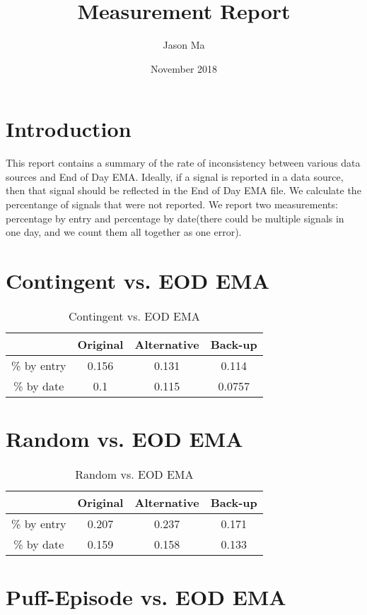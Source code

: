 \documentclass[11pt]{article}
\title{Measurement Report}
\author{Jason Ma}
\date{November 2018}
\begin{document}
\maketitle
\section{Introduction}
This report contains a summary of the rate of inconsistency between various data sources and End of Day EMA. Ideally, if a signal is reported in a data source, then that signal should be reflected in the End of Day EMA file. We calculate the percentange of signals that were not reported. We report two measurements: percentage by entry and percentage by date(there could be multiple signals in one day, and we count them all together as one error).
\section{Contingent vs. EOD EMA}

\begin{table}[h]
\centering
\begin{tabular}{|c|c|c|c|} 
 \hline
& Original & Alternative & Back-up \\
\hline
\% by entry & 0.156 & 0.131 & 0.114\\
\hline
\% by date & 0.1 & 0.115 & 0.0757 \\
\hline
\end{tabular}
\caption{Contingent vs. EOD EMA}
\label{table:1}
\end{table}

\section{Random vs. EOD EMA}

\begin{table}[h]
\centering
\begin{tabular}{|c|c|c|c|} 
 \hline
& Original & Alternative & Back-up \\
\hline
\% by entry & 0.207 & 0.237 & 0.171 \\
\hline
\% by date & 0.159 & 0.158 & 0.133 \\
\hline
\end{tabular}
\caption{Random vs. EOD EMA}
\label{table:2}
\end{table}

\section{Puff-Episode vs. EOD EMA}
\end{document}
